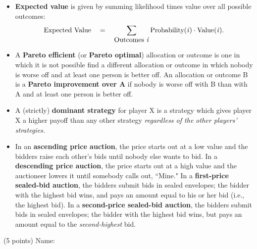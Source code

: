 \documentclass[twoside]{article}
\begin{document}
\begin{EXAM}
\begin{itemize}
\item \textbf{Expected value} is given by summing likelihood times value over all possible outcomes:
\[
\mbox{Expected Value}\ \ \  = \ \ \ \sum_{\mbox{Outcomes \emph{i}}} \mbox{Probability(\emph{i})} \cdot \mbox{Value(\emph{i})}.
\]



\item A \textbf{Pareto efficient} (or \textbf{Pareto optimal}) allocation or outcome is one in which it is not possible find a different allocation or outcome in which nobody is worse off and at least one person is better off. An allocation or outcome B is a \textbf{Pareto improvement over A} if nobody is worse off with B than with A and at least one person is better off.

\item A (strictly) \textbf{dominant strategy} for player X is a strategy which gives player X a higher payoff than any other strategy \emph{regardless of the other players' strategies.} %


\item In an \textbf{ascending price auction}, the price starts out at a low value and the bidders raise each other's bids until nobody else wants to bid. In a \textbf{descending price auction}, the price starts out at a high value and the auctioneer lowers it until somebody calls out, ``Mine." In a \textbf{first-price sealed-bid auction}, the bidders submit bids in sealed envelopes; the bidder with the highest bid wins, and pays an amount equal to his or her bid (i.e., the highest bid). In a \textbf{second-price sealed-bid auction}, the bidders submit bids in sealed envelopes; the bidder with the highest bid wins, but pays an amount equal to the \emph{second-highest} bid.
\end{itemize}
\cleardoublepage
\end{EXAM}

\begin{EXAM}


\begin{flushright}
(5 points) Name: \hspace*{1in}
\end{flushright}

\bigskip \bigskip

\end{EXAM}
\end{document}
